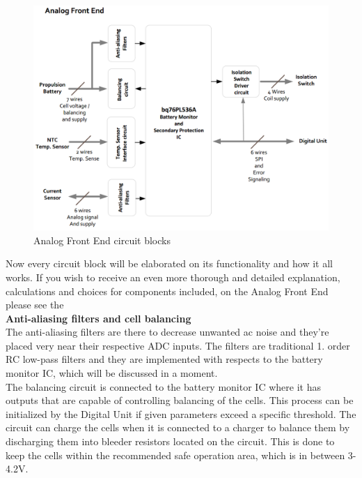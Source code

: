 \begin{figure}[H]
	\centering
	\includegraphics[width=1.0\linewidth]{Hardware/Pictures/analogfrontendOverview}
	\caption[Empty]{Analog Front End circuit blocks\footnotemark}
	\label{fig:frontendOverview}
\end{figure}

Now every circuit block will be elaborated on its functionality and how it all works. If you wish to receive an even more thorough and detailed explanation, calculations and choices for components included, on the Analog Front End please see the \\

\textbf{Anti-aliasing filters and cell balancing}\\
The anti-aliasing filters are there to decrease unwanted ac noise and they're placed very near their respective ADC inputs. The filters are traditional 1. order RC low-pass filters and they are implemented with respects to the battery monitor IC, which will be discussed in a moment.\\
The balancing circuit is connected to the battery monitor IC where it has outputs that are capable of controlling balancing of the cells. This process can be initialized by the Digital Unit if given parameters exceed a specific threshold. The circuit can charge the cells  when it is connected to a charger to balance them by discharging them into bleeder resistors located on the circuit. This is done to keep the cells within the recommended safe operation area, which is in between 3-4.2V.


